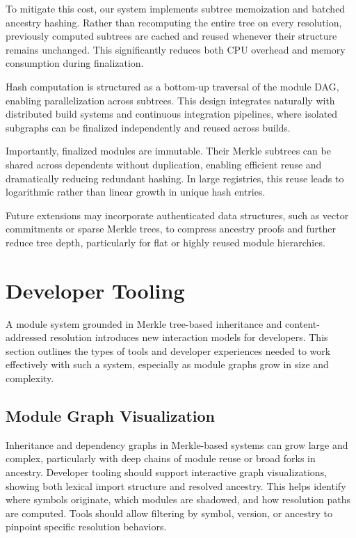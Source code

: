 \documentclass[sigplan,screen]{acmart}
\begin{document}
To mitigate this cost, our system implements subtree memoization and batched ancestry hashing. Rather than recomputing the entire tree on every resolution, previously computed subtrees are cached and reused whenever their structure remains unchanged. This significantly reduces both CPU overhead and memory consumption during finalization.

Hash computation is structured as a bottom-up traversal of the module DAG, enabling parallelization across subtrees. This design integrates naturally with distri\-buted build systems and continuous integration pipe\-lines, where isolated subgraphs can be finalized independently and reused across builds.

Importantly, finalized modules are immutable. Their Merkle subtrees can be shared across dependents without duplication, enabling efficient reuse and dramatically reducing redundant hashing. In large registries, this reuse leads to logarithmic rather than linear growth in unique hash entries.

Future extensions may incorporate authenticated data structures, such as vector commitments or sparse Merkle trees, to compress ancestry proofs and further reduce tree depth, particularly for flat or highly reused module hierarchies.

\section{Developer Tooling}
\label{sec:developer-tooling}

A module system grounded in Merkle tree-based inheritance and content-addressed resolution introduces new interaction models for developers. This section outlines the types of tools and developer experiences needed to work effectively with such a system, especially as module graphs grow in size and complexity.

\subsection{Module Graph Visualization}

Inheritance and dependency graphs in Merkle-based systems can grow large and complex, particularly with deep chains of module reuse or broad forks in ancestry. Developer tooling should support interactive graph visualizations, showing both lexical import structure and resolved ancestry. This helps identify where symbols originate, which modules are shadowed, and how resolution paths are computed. Tools should allow filtering by symbol, version, or ancestry to pinpoint specific resolution behaviors.
\end{document}
